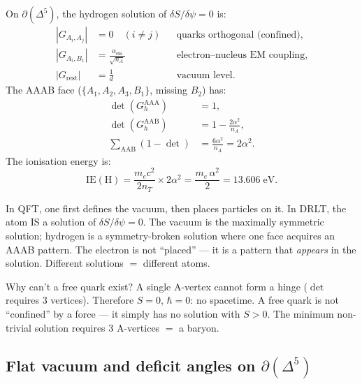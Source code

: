 \begin{theorem}
\label{thm:hydrogen_solution}
On $\partial(\Delta^5)$, the hydrogen solution of $\delta S/\delta\psi = 0$ is:
\begin{align}
|G_{A_i, A_j}| &= 0 \quad (i \ne j) &&\text{quarks orthogonal (confined)}, \\
|G_{A_i, B_1}| &= \frac{\alpha_{\mathrm{em}}}{\sqrt{n_A}} &&\text{electron--nucleus EM coupling}, \\
|G_{\mathrm{rest}}| &= \frac{1}{d} &&\text{vacuum level}.
\end{align}
The AAAB face ($\{A_1, A_2, A_3, B_1\}$, missing $B_2$) has:
\begin{align}
\det(G_h^{\mathrm{AAA}}) &= 1, \\
\det(G_h^{\mathrm{AAB}}) &= 1 - \frac{2\alpha^2}{n_A}, \\
\sum_{\mathrm{AAB}} (1 - \det) &= \frac{6\alpha^2}{n_A} = 2\alpha^2.
\end{align}
The ionisation energy is:
\begin{equation}
\boxed{\mathrm{IE}(\mathrm{H}) = \frac{m_e c^2}{2 n_T} \times 2\alpha^2 = \frac{m_e\,\alpha^2}{2} = 13.606\;\mathrm{eV}.}
\end{equation}
\end{theorem}

\begin{remark}
In QFT, one first defines the vacuum, then places particles on it.  In DRLT, the atom IS a solution of $\delta S/\delta\psi = 0$.  The vacuum is the maximally symmetric solution; hydrogen is a symmetry-broken solution where one face acquires an AAAB pattern.  The electron is not ``placed'' --- it is a pattern that \emph{appears} in the solution.  Different solutions $=$ different atoms.
\end{remark}

\begin{remark}
Why can't a free quark exist?  A single A-vertex cannot form a hinge ($\det$ requires 3 vertices).  Therefore $S = 0$, $\hbar = 0$: no spacetime.  A free quark is not ``confined'' by a force --- it simply has no solution with $S > 0$.  The minimum non-trivial solution requires 3 A-vertices $=$ a baryon.
\end{remark}

\subsection{Flat vacuum and deficit angles on $\partial(\Delta^5)$}
\label{sec:flat_vacuum}

